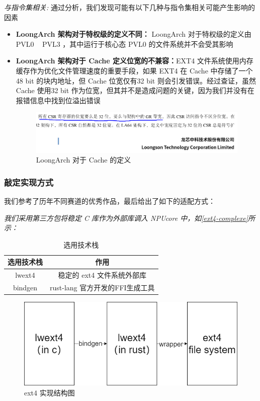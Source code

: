 \textit{与指令集相关:}
通过分析，我们发现可能有以下几种与指令集相关可能产生影响的因素
\begin{itemize}
    \item \textbf{LoongArch 架构对于特权级的定义不同：} LoongArch 对于特权级的定义由 PVL0 ~ PVL3 ，其中运行于核心态 PVL0 的文件系统并不会受其影响
    \item \textbf{LoongArch 架构对于 Cache 定义位宽的不兼容：}EXT4 文件系统使用内存缓存作为优化文件管理速度的重要手段，如果 EXT4 在 Cache 中存储了一个 48 bit 的块内地址，但 Cache 位宽仅有32 bit 则会引发错误。经过查证，虽然 Cache 使用32 bit 作为位宽，但其并不是造成问题的关键，因为我们并没有在报错信息中找到位溢出错误
    \begin{figure}[htbp]
        \centering
        \includegraphics[width=0.6\linewidth]{figs/csrrd.PNG}
        \caption{LoongArch 对于 Cache 的定义}
    \end{figure}
\end{itemize}

\subsubsection{敲定实现方式}

我们参考了历年不同赛道的优秀作品，最后给出了如下的适配方式：

\textit{我们采用第三方包将稳定 C 库作为外部库调入 NPUcore 中，如\autoref{ext4-complexe}所示：}

\begin{table}[htbp]
    \centering
    \begin{tabular}{|c|c|}
        \hline
        选用技术栈 & 作用 \\
        \hline
        lwext4 & 稳定的 ext4 文件系统外部库 \\
        bindgen & rust-lang 官方开发的FFI生成工具 \\
        \hline
    \end{tabular}
    \caption{选用技术栈}
\end{table}


\begin{figure}[htbp]
    \centering
    \includegraphics[width=0.6\linewidth]{figs/plan-ext.png}
    \caption{ext4 实现结构图}
    \label{ext4-complexe}
\end{figure}

